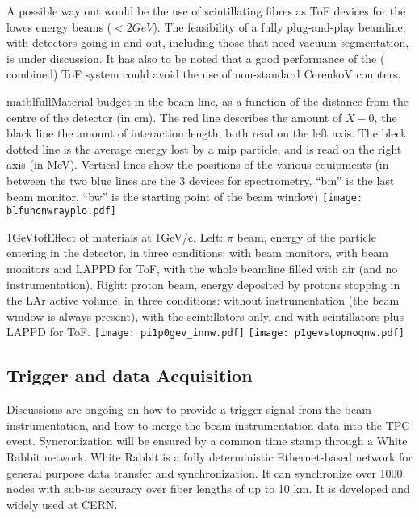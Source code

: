 A possible way out would be the use of scintillating fibres as ToF devices for the lowes energy beams ($< 2 GeV$).  The feasibility of a fully plug-and-play beamline, with detectors going in and out, including those that need vacuum segmentation, is under discussion. It has also to be noted that a good performance of the ( combined) ToF system could avoid the use of non-standard CerenkoV counters.
 \begin{cdrfigure}{matblfull}{Material budget in the beam line, as a function of the distance from the centre of the detector (in cm). The red line describes the amount of $X-0$, the black line the amount of interaction length, both read on the left axis. The bleck dotted line is the average energy lost by a mip particle, and is read on the right axis (in MeV). Vertical lines show the positions of the various equipments (in between the two blue lines are the 3 devices for spectrometry, ``bm'' is the last beam monitor, ``bw'' is the starting point of the beam window)}  
\texttt{[image: blfuhcnwrayplo.pdf]}
\end{cdrfigure}
 \begin{cdrfigure}{1GeVtof}{Effect of materials at  1GeV/c. Left: $\pi$ beam, energy of the particle entering in the detector, in three conditions: with  beam monitors, with beam monitors and LAPPD for ToF, with the whole beamline filled with air (and no instrumentation). Right: proton beam, energy deposited by protons stopping in the LAr active volume, in three conditions: without instrumentation (the beam window is always present), with the scintillators only, and with scintillators plus LAPPD for ToF.  }
\texttt{[image: pi1p0gev\_innw.pdf]}
\texttt{[image: p1gevstopnoqnw.pdf]}
\end{cdrfigure}
  

\subsection {Trigger and data Acquisition}
Discussions are ongoing on how to provide a trigger signal from the beam instrumentation, and how to merge the beam instrumentation data into the TPC event. Syncronization will be ensured by a common time stamp through a White Rabbit network. White Rabbit is a fully deterministic Ethernet-based network for general purpose data transfer and synchronization. It can synchronize over 1000 nodes with sub-ns accuracy over fiber lengths of up to 10 km. It is developed and widely used at CERN.

